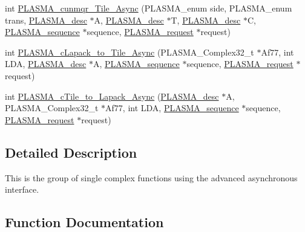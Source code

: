 \begin{DoxyCompactItemize}
\item 
int \hyperlink{group__PLASMA__Complex32__t__Tile__Async_gaff053a5b7bc9208a3a61a4117c454355_gaff053a5b7bc9208a3a61a4117c454355}{P\+L\+A\+S\+M\+A\+\_\+cunmqr\+\_\+\+Tile\+\_\+\+Async} (P\+L\+A\+S\+M\+A\+\_\+enum side, P\+L\+A\+S\+M\+A\+\_\+enum trans, \hyperlink{structplasma__desc__t}{P\+L\+A\+S\+M\+A\+\_\+desc} $\ast$A, \hyperlink{structplasma__desc__t}{P\+L\+A\+S\+M\+A\+\_\+desc} $\ast$T, \hyperlink{structplasma__desc__t}{P\+L\+A\+S\+M\+A\+\_\+desc} $\ast$C, \hyperlink{structplasma__sequence__t}{P\+L\+A\+S\+M\+A\+\_\+sequence} $\ast$sequence, \hyperlink{structplasma__request__t}{P\+L\+A\+S\+M\+A\+\_\+request} $\ast$request)
\item 
int \hyperlink{group__PLASMA__Complex32__t__Tile__Async_ga9a17887354d09549a2a831e647eff928_ga9a17887354d09549a2a831e647eff928}{P\+L\+A\+S\+M\+A\+\_\+c\+Lapack\+\_\+to\+\_\+\+Tile\+\_\+\+Async} (P\+L\+A\+S\+M\+A\+\_\+\+Complex32\+\_\+t $\ast$Af77, int L\+D\+A, \hyperlink{structplasma__desc__t}{P\+L\+A\+S\+M\+A\+\_\+desc} $\ast$A, \hyperlink{structplasma__sequence__t}{P\+L\+A\+S\+M\+A\+\_\+sequence} $\ast$sequence, \hyperlink{structplasma__request__t}{P\+L\+A\+S\+M\+A\+\_\+request} $\ast$request)
\item 
int \hyperlink{group__PLASMA__Complex32__t__Tile__Async_ga30cd248f00d076c4417a96a041a7e85e_ga30cd248f00d076c4417a96a041a7e85e}{P\+L\+A\+S\+M\+A\+\_\+c\+Tile\+\_\+to\+\_\+\+Lapack\+\_\+\+Async} (\hyperlink{structplasma__desc__t}{P\+L\+A\+S\+M\+A\+\_\+desc} $\ast$A, P\+L\+A\+S\+M\+A\+\_\+\+Complex32\+\_\+t $\ast$Af77, int L\+D\+A, \hyperlink{structplasma__sequence__t}{P\+L\+A\+S\+M\+A\+\_\+sequence} $\ast$sequence, \hyperlink{structplasma__request__t}{P\+L\+A\+S\+M\+A\+\_\+request} $\ast$request)
\end{DoxyCompactItemize}


\subsection{Detailed Description}
This is the group of single complex functions using the advanced asynchronous interface. 

\subsection{Function Documentation}
\hypertarget{group__PLASMA__Complex32__t__Tile__Async_ga5e4525a8ab1eca6b3e69704ec839329a_ga5e4525a8ab1eca6b3e69704ec839329a}{}
